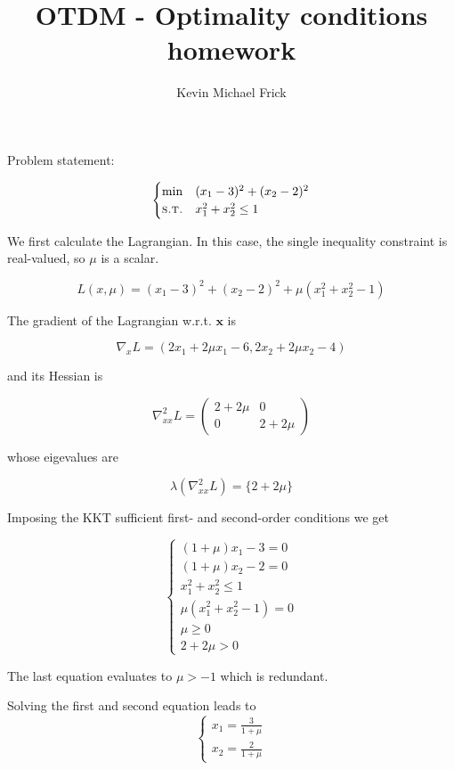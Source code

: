 \documentclass{article}
\author{Kevin Michael Frick}
\title{OTDM - Optimality conditions homework}
\begin{document}
\maketitle
Problem statement:

\begin{equation*}
\begin{cases}
\min &(x_1 - 3)^2 + (x_2 - 2)^2  \\
\textsc{s.t.} & x_1^2 + x_2^2 \leq 1
\end{cases}
\end{equation*}

We first calculate the Lagrangian. In this case, the single inequality constraint is real-valued, so $\mu$ is a scalar.

$$L(x, \mu) = (x_1 - 3)^2 + (x_2 - 2)^2 + \mu(x_1^2 + x_2^2 - 1)$$

The gradient of the Lagrangian w.r.t. $\mathbf{x}$ is

$$\nabla_x L = (2 x_1 + 2\mu x_1 - 6, 2x_2 + 2 \mu x_2 - 4)$$ 

and its Hessian is

$$\nabla^2_{xx} L = \begin{pmatrix} 2 + 2 \mu & 0 \\ 0 & 2 + 2 \mu\end{pmatrix}$$

whose eigevalues are

$$\lambda(\nabla^2_{xx} L) = \{2 + 2 \mu\}$$

Imposing the KKT sufficient first- and second-order conditions we get

\begin{equation*}
\begin{cases}
(1 + \mu) x_1 - 3 = 0 \\
(1 + \mu) x_2 - 2 = 0 \\
x_1^2 + x_2^2 \leq 1 \\
\mu(x_1^2 + x_2^2 - 1) = 0 \\
\mu \geq 0 \\
2 + 2\mu > 0
\end{cases}
\end{equation*}

The last equation evaluates to $\mu > -1$ which is redundant. 

Solving the first and second equation leads to 
\begin{equation*}
\begin{cases}
x_1 = \frac{3}{1 + \mu} \\
x_2 = \frac{2}{1 + \mu} 
\end{cases}
\end{equation*}
\end{document}
